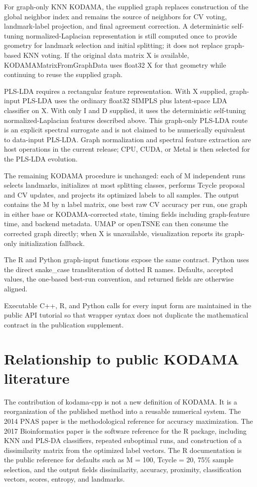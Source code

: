 \documentclass[twoside,11pt]{article}
\begin{document}
\begin{small}
For graph-only KNN KODAMA, the supplied graph replaces construction of the global neighbor index and remains the source of neighbors for CV voting, landmark-label projection, and final agreement correction. A deterministic self-tuning normalized-Laplacian representation is still computed once to provide geometry for landmark selection and initial splitting; it does not replace graph-based KNN voting. If the original data matrix X is available, KODAMAMatrixFromGraphData uses float32 X for that geometry while continuing to reuse the supplied graph.

PLS-LDA requires a rectangular feature representation. With X supplied, graph-input PLS-LDA uses the ordinary float32 SIMPLS plus latent-space LDA classifier on X. With only I and D supplied, it uses the deterministic self-tuning normalized-Laplacian features described above. This graph-only PLS-LDA route is an explicit spectral surrogate and is not claimed to be numerically equivalent to data-input PLS-LDA. Graph normalization and spectral feature extraction are host operations in the current release; CPU, CUDA, or Metal is then selected for the PLS-LDA evolution.

The remaining KODAMA procedure is unchanged: each of M independent runs selects landmarks, initializes at most splitting classes, performs Tcycle proposal and CV updates, and projects its optimized labels to all samples. The output contains the M by n label matrix, one best raw CV accuracy per run, one graph in either base or KODAMA-corrected state, timing fields including graph-feature time, and backend metadata. UMAP or openTSNE can then consume the corrected graph directly; when X is unavailable, visualization reports its graph-only initialization fallback.

The R and Python graph-input functions expose the same contract. Python uses the direct snake\_case transliteration of dotted R names. Defaults, accepted values, the one-based best-run convention, and returned fields are otherwise aligned.

Executable C++, R, and Python calls for every input form are maintained in the public API tutorial so that wrapper syntax does not duplicate the mathematical contract in the publication supplement.

\section{Relationship to public KODAMA literature}
The contribution of kodama-cpp is not a new definition of KODAMA. It is a reorganization of the published method into a reusable numerical system. The 2014 PNAS paper is the methodological reference for accuracy maximization. The 2017 Bioinformatics paper is the software reference for the R package, including KNN and PLS-DA classifiers, repeated suboptimal runs, and construction of a dissimilarity matrix from the optimized label vectors. The R documentation is the public reference for defaults such as M = 100, Tcycle = 20, 75\% sample selection, and the output fields dissimilarity, accuracy, proximity, classification vectors, scores, entropy, and landmarks.


\end{small}
\end{document}
